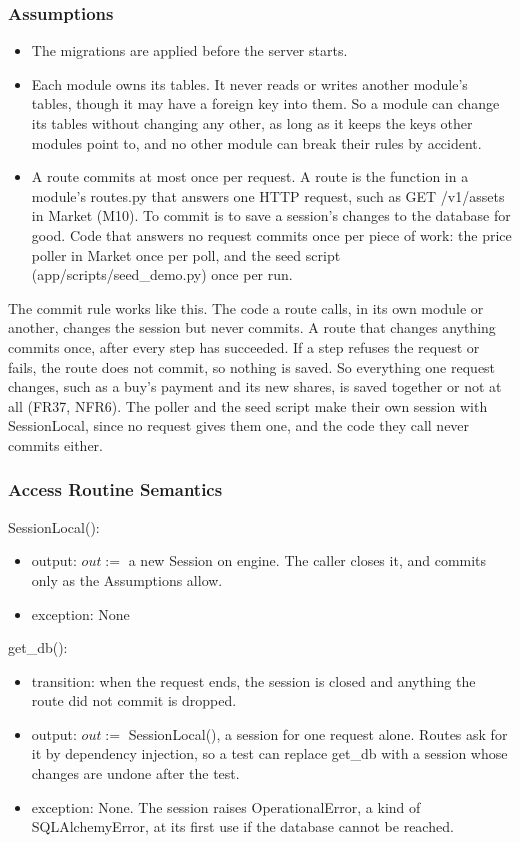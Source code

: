 \documentclass[12pt, titlepage]{article}
\begin{document}
\subsubsection{Assumptions}

\begin{itemize}
\item The migrations are applied before the server starts.
\item Each module owns its tables. It never reads or writes another module's
  tables, though it may have a foreign key into them. So a module can change
  its tables without changing any other, as long as it keeps the keys other
  modules point to, and no other module can break their
  rules by accident.
\item A route commits at most once per request. A route is the function in a
  module's routes.py that answers one HTTP request, such as GET /v1/assets in
  Market (M10). To commit is to save a session's changes to the database for
  good. Code that answers no request commits once per piece of work: the price
  poller in Market once per poll, and the seed script
  (app/scripts/seed\_demo.py) once per run.
\end{itemize}

\noindent The commit rule works like this. The code a route calls, in its own
module or another, changes the session but never commits. A route that changes
anything commits once, after every step has succeeded. If a step refuses the
request or fails, the route does not commit, so nothing is saved. So everything
one request changes, such as a buy's payment and its new shares, is saved
together or not at all (FR37, NFR6). The poller and the seed script make their
own session with SessionLocal, since no request gives them one, and the code
they call never commits either.

\subsubsection{Access Routine Semantics}

\noindent SessionLocal():
\begin{itemize}
\item output: $out :=$ a new Session on engine. The caller closes it, and
  commits only as the Assumptions allow.
\item exception: None
\end{itemize}

\noindent get\_db():
\begin{itemize}
\item transition: when the request ends, the session is closed and anything
  the route did not commit is dropped.
\item output: $out :=$ SessionLocal(), a session for one request alone. Routes
  ask for it by dependency injection, so a test can replace get\_db with a
  session whose changes are undone after the test.
\item exception: None. The session raises OperationalError, a kind of
  SQLAlchemyError, at its first use if the database cannot be reached.
\end{itemize}
\end{document}
